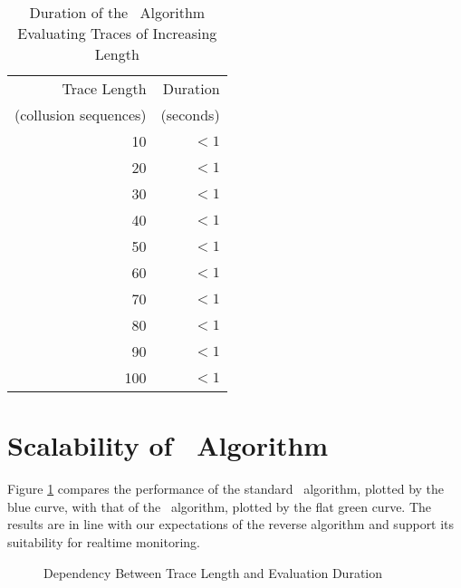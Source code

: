 \begin{table}[h!]
	\centering
	\captionsetup{width=0.6\linewidth, justification=centering}
	\begin{tabular}{r|r} 
	Trace Length  & Duration\\
	(collusion sequences) & (seconds)\\
	\hline
	10 & $<1$\\
	20 & $<1$\\
	30 & $<1$\\
	40 & $<1$\\
	50 & $<1$\\
	60 & $<1$\\
	70 & $<1$\\
	80 & $<1$\\
	90 & $<1$\\
	100 & $<1$\\
	\hline
	\end{tabular}
	\caption{Duration of the \RRH\ Algorithm Evaluating Traces of Increasing Length}
	\label{tab:ReverseRHExecutionTimes}
\end{table}

\newpage

\section{Scalability of \RRH\ Algorithm}
\label{sec:Scalability Of Reverse Rosu-Havelund Algorithm}

Figure \ref{fig:ReverseRHEvaluationDuration} compares the performance of the standard \RH\ algorithm, plotted by the blue curve, with that of the \RRH\ algorithm, plotted by the flat green curve.  The results are in line with our expectations of the reverse algorithm and support its suitability for realtime monitoring.

\begin{figure}[h!]
	\centering
	\caption{Dependency Between Trace Length and Evaluation Duration}
	\label{fig:ReverseRHEvaluationDuration}
\end{figure}